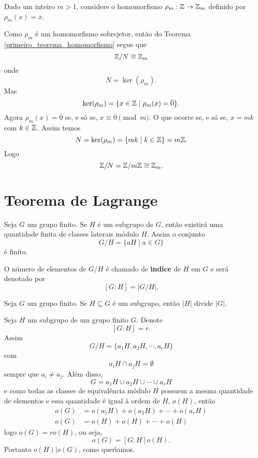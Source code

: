 \begin{exemplo}
    Dado um inteiro $m > 1$, considere o homomorfismo $\rho_m : \mathbb{Z} \to \mathbb{Z}_m$ definido por $\rho_m(x) = \overline{x}$.
\end{exemplo}
\begin{solucao}
    Como $\rho_m$ \'e um homomorfismo sobrejetor, ent\~ao do Teorema \ref{primeiro_teorema_homomorfismo} segue que
    \[
        \mathbb{Z}/N \cong \mathbb{Z}_m
    \]
    onde
    \[
        N = \ker(\rho_m).
    \]
    Mas
    \[
        \ker(\rho_m) = \{x \in \mathbb{Z} \mid \rho_m(x) = \overline{0}\}.
    \]
    Agora $\rho_m(x) = \overline{0}$ se, e s\'o se, $x \equiv 0 \pmod m$. O que ocorre se, e s\'o se, $x = mk$ com $k \in \mathbb{Z}$. Assim temos
    \[
        N = \ker(\rho_m) = \{mk \mid k \in \mathbb{Z}\} = m\mathbb{Z}.
    \]
    Logo
    \[
        \mathbb{Z}/N = \mathbb{Z}/m\mathbb{Z} \cong \mathbb{Z}_m.
    \]
\end{solucao}

\section{Teorema de Lagrange}

Seja $G$ um grupo finito. Se $H$ \'e um subgrupo de $G$, ent\~ao existir\'a uma quantidade finita de classes laterais m\'odulo $H$.
Assim o conjunto
\[
    G/H = \{aH \mid a \in G\}
\]
\'e finito.

O n\'umero de elementos de $G/H$ \'e chamado de \textbf{{\'\i}ndice} de $H$ em $G$ e ser\'a denotado por
\[
    [G : H] = |G/H|.
\]

\begin{teorema}\label{teorema_de_lagrange}
    Seja $G$ um grupo finito. Se $H\subseteq G$ {\'e} um subgrupo, ent{\~a}o $|H|$ divide $|G|$.
\end{teorema}
\begin{prova}
    Seja $H$ um subgrupo de um grupo finito $G$. Denote
    \[
        [G : H] = r.
    \]
    Assim
    \[
        G/H = \{a_1H, a_2H, \cdots, a_rH\}
    \]
    com
    \[
        a_iH \cap a_jH = \emptyset
    \]
    sempre que $a_i \ne a_j$. Al\'em disso,
    \[
        G = a_1H \cup a_2H \cup \cdots \cup a_rH
    \]
    e como todas as classes de equival\^encia m\'odulo $H$ possuem a mesma quantidade de elementos e essa quantidade \'e igual \`a ordem de $H$, $o(H)$, ent\~ao
    \begin{align*}
        o(G) &= o(a_1H) + o(a_2H) + \cdots + o(a_rH)\\
        o(G) &= o(H) + o(H) + \cdots + o(H)
    \end{align*}
    logo $o(G) = ro(H)$, ou seja,
    \[
        o(G) = [G : H]o(H).
    \]
    Portanto $o(H) | o(G)$, como quer{\'\i}amos.
\end{prova}

